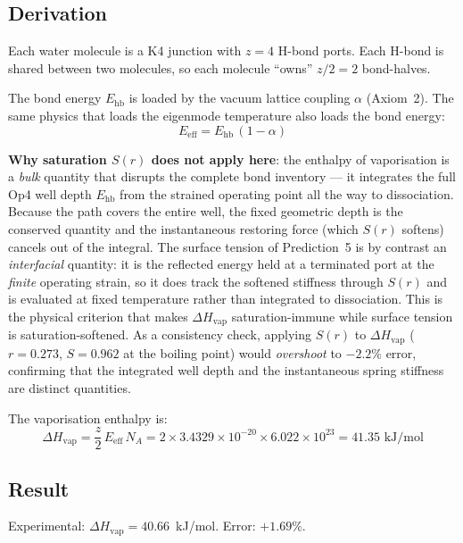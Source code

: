 \subsection{Derivation}

Each water molecule is a K4 junction with $z = 4$ H-bond ports. Each H-bond is shared between two molecules, so each molecule ``owns'' $z/2 = 2$ bond-halves.

The bond energy $E_\mathrm{hb}$ is loaded by the vacuum lattice coupling $\alpha$ (Axiom~2). The same physics that loads the eigenmode temperature also loads the bond energy:
\begin{equation}
    E_\mathrm{eff} = E_\mathrm{hb}\,(1-\alpha)
\end{equation}

\textbf{Why saturation $S(r)$ does not apply here}: the enthalpy of vaporisation is a \emph{bulk} quantity that disrupts the complete bond inventory --- it integrates the full Op4 well depth $E_\mathrm{hb}$ from the strained operating point all the way to dissociation. Because the path covers the entire well, the fixed geometric depth is the conserved quantity and the instantaneous restoring force (which $S(r)$ softens) cancels out of the integral. The surface tension of Prediction~5 is by contrast an \emph{interfacial} quantity: it is the reflected energy held at a terminated port at the \emph{finite} operating strain, so it does track the softened stiffness through $S(r)$ and is evaluated at fixed temperature rather than integrated to dissociation. This is the physical criterion that makes $\Delta H_\mathrm{vap}$ saturation-immune while surface tension is saturation-softened. As a consistency check, applying $S(r)$ to $\Delta H_\mathrm{vap}$ ($r = 0.273$, $S = 0.962$ at the boiling point) would \emph{overshoot} to $-2.2\%$ error, confirming that the integrated well depth and the instantaneous spring stiffness are distinct quantities.

The vaporisation enthalpy is:
\begin{equation}
\boxed{
    \Delta H_\mathrm{vap} = \frac{z}{2}\, E_\mathrm{eff}\, N_A = 2 \times 3.4329 \times 10^{-20} \times 6.022 \times 10^{23} = 41.35 \text{ kJ/mol}
}
\end{equation}

\subsection{Result}
Experimental: $\Delta H_\mathrm{vap} = 40.66$~kJ/mol. \quad Error: $\mathbf{+1.69\%}$.


